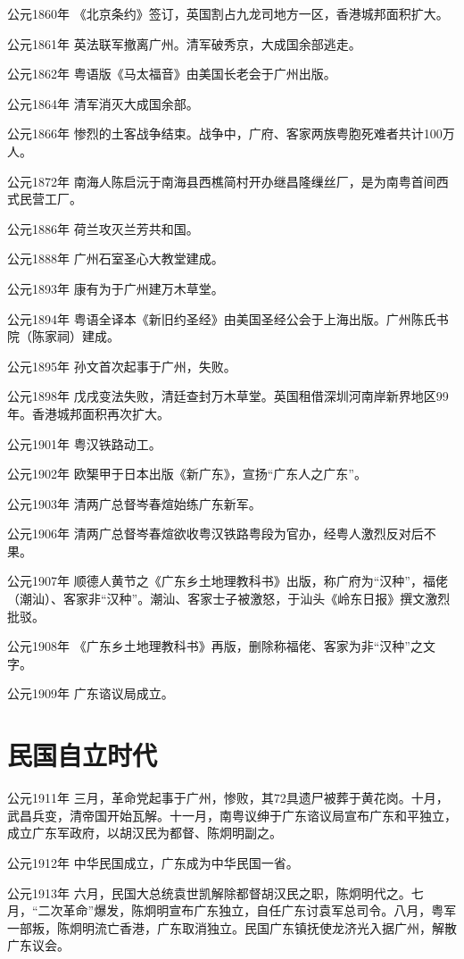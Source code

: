 公元1860年 《北京条约》签订，英国割占九龙司地方一区，香港城邦面积扩大。

公元1861年 英法联军撤离广州。清军破秀京，大成国余部逃走。

公元1862年 粤语版《马太福音》由美国长老会于广州出版。

公元1864年 清军消灭大成国余部。

公元1866年 惨烈的土客战争结束。战争中，广府、客家两族粤胞死难者共计100万人。

公元1872年 南海人陈启沅于南海县西樵简村开办继昌隆缫丝厂，是为南粤首间西式民营工厂。

公元1886年 荷兰攻灭兰芳共和国。

公元1888年 广州石室圣心大教堂建成。

公元1893年 康有为于广州建万木草堂。

公元1894年 粤语全译本《新旧约圣经》由美国圣经公会于上海出版。广州陈氏书院（陈家祠）建成。

公元1895年 孙文首次起事于广州，失败。

公元1898年 戊戌变法失败，清廷查封万木草堂。英国租借深圳河南岸新界地区99年。香港城邦面积再次扩大。

公元1901年 粤汉铁路动工。

公元1902年 欧榘甲于日本出版《新广东》，宣扬“广东人之广东”。

公元1903年 清两广总督岑春煊始练广东新军。

公元1906年 清两广总督岑春煊欲收粤汉铁路粤段为官办，经粤人激烈反对后不果。

公元1907年 顺德人黄节之《广东乡土地理教科书》出版，称广府为“汉种”，福佬（潮汕）、客家非“汉种”。潮汕、客家士子被激怒，于汕头《岭东日报》撰文激烈批驳。

公元1908年 《广东乡土地理教科书》再版，删除称福佬、客家为非“汉种”之文字。

公元1909年 广东谘议局成立。

\section*{民国自立时代}

公元1911年 三月，革命党起事于广州，惨败，其72具遗尸被葬于黄花岗。十月，武昌兵变，清帝国开始瓦解。十一月，南粤议绅于广东谘议局宣布广东和平独立，成立广东军政府，以胡汉民为都督、陈炯明副之。

公元1912年 中华民国成立，广东成为中华民国一省。

公元1913年 六月，民国大总统袁世凯解除都督胡汉民之职，陈炯明代之。七月，“二次革命”爆发，陈炯明宣布广东独立，自任广东讨袁军总司令。八月，粤军一部叛，陈炯明流亡香港，广东取消独立。民国广东镇抚使龙济光入据广州，解散广东议会。

